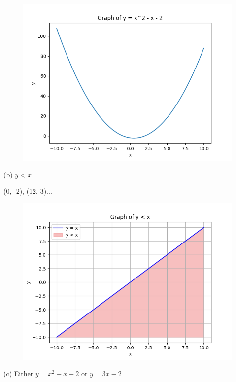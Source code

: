 \documentclass[11pt]{article}
\begin{document}
\begin{figure}[H]
\includegraphics[width=\textwidth]{a.png}
\end{figure}

\noindent (b) $y < x$

(0, -2), (12, 3)... 

\begin{figure}[H]
\includegraphics[width=\textwidth]{b.png}
\end{figure}

\noindent (c) Either $y = x^2 - x - 2$ or $y = 3x - 2$
\end{document}
